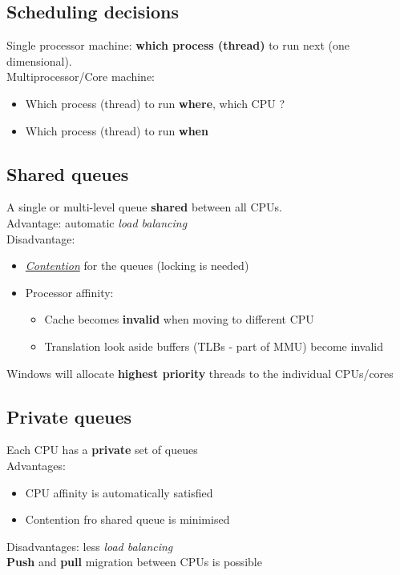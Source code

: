 \documentclass{article}
\newcommand{\worddef}[1]{\hyperref[sec:reference]{\textit{#1}}}
\begin{document}
\subsection{Scheduling decisions}
\begin{flushleft}
Single processor machine: \textbf{which process (thread)} to run next (one dimensional).\\
Multiprocessor/Core machine:
\begin{itemize}
	\item Which process (thread) to run \textbf{where}, which CPU ?
	\item Which process (thread) to run \textbf{when}
\end{itemize}
\end{flushleft}

\subsection{Shared queues}
\begin{flushleft}
A single or multi-level queue \textbf{shared} between all CPUs.\\
Advantage: automatic \textit{load balancing}\\
Disadvantage:
\begin{itemize}
	\item \worddef{Contention} for the queues (locking is needed)
	\item Processor affinity:
	\begin{itemize}
		\item Cache becomes \textbf{invalid} when moving to different CPU
		\item Translation look aside buffers (TLBs - part of MMU) become invalid
	\end{itemize}
\end{itemize}
Windows will allocate \textbf{highest priority} threads to the individual CPUs/cores
\end{flushleft}

\subsection{Private queues}
\begin{flushleft}
Each CPU has a \textbf{private} set of queues\\
Advantages:
\begin{itemize}
	\item CPU affinity is automatically satisfied
	\item Contention fro shared queue is minimised
\end{itemize}
Disadvantages: less \textit{load balancing}\\
\textbf{Push} and \textbf{pull} migration between CPUs is possible
\end{flushleft}
\end{document}
